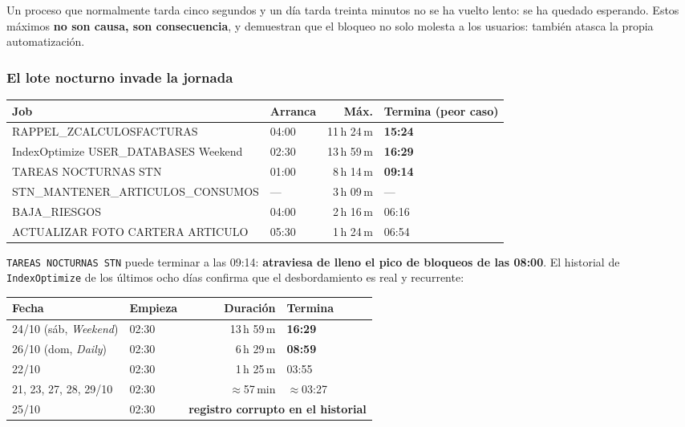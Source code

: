 \documentclass[11pt,a4paper]{article}
\newcommand{\cod}[1]{\texttt{\small #1}}
\newcommand{\critico}[1]{\textcolor{rojo}{\textbf{#1}}}
\newcommand{\aviso}[1]{\textcolor{ambar}{\textbf{#1}}}
\begin{document}
Un proceso que normalmente tarda cinco segundos y un día tarda treinta
minutos no se ha vuelto lento: se ha quedado esperando. Estos máximos
\textbf{no son causa, son consecuencia}, y demuestran que el bloqueo no solo
molesta a los usuarios: también atasca la propia automatización.

\subsubsection*{El lote nocturno invade la jornada}

\begin{table}[h]
\centering
\small
\begin{tabular}{llrl}
\toprule
\textbf{Job} & \textbf{Arranca} & \textbf{Máx.} & \textbf{Termina (peor caso)} \\
\midrule
RAPPEL\_ZCALCULOSFACTURAS & 04:00 & 11\,h 24\,m & \critico{15:24} \\
IndexOptimize USER\_DATABASES Weekend & 02:30 & 13\,h 59\,m & \critico{16:29} \\
TAREAS NOCTURNAS STN & 01:00 & 8\,h 14\,m & \critico{09:14} \\
STN\_MANTENER\_ARTICULOS\_CONSUMOS & --- & 3\,h 09\,m & --- \\
BAJA\_RIESGOS & 04:00 & 2\,h 16\,m & 06:16 \\
ACTUALIZAR FOTO CARTERA ARTICULO & 05:30 & 1\,h 24\,m & 06:54 \\
\bottomrule
\end{tabular}
\end{table}

\cod{TAREAS NOCTURNAS STN} puede terminar a las 09:14: \textbf{atraviesa de
lleno el pico de bloqueos de las 08:00}. El historial de \cod{IndexOptimize}
de los últimos ocho días confirma que el desbordamiento es real y recurrente:

\begin{table}[h]
\centering
\small
\begin{tabular}{llrl}
\toprule
\textbf{Fecha} & \textbf{Empieza} & \textbf{Duración} & \textbf{Termina} \\
\midrule
24/10 (sáb, \emph{Weekend}) & 02:30 & 13\,h 59\,m & \critico{16:29} \\
26/10 (dom, \emph{Daily})   & 02:30 &  6\,h 29\,m & \critico{08:59} \\
22/10 & 02:30 & 1\,h 25\,m & 03:55 \\
21, 23, 27, 28, 29/10 & 02:30 & $\approx$57\,min & $\approx$03:27 \\
25/10 & 02:30 & \multicolumn{2}{l}{\aviso{registro corrupto en el historial}} \\
\bottomrule
\end{tabular}
\end{table}
\end{document}
